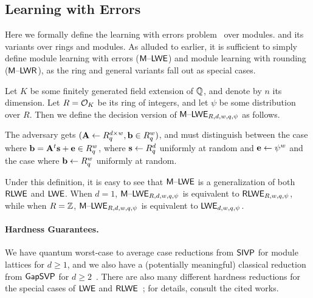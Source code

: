 \fi

\subsection{Learning with Errors}
\label{sec:learning-with-errors}

Here we formally define the learning with errors
problem~\cite{DBLP:journals/jacm/Regev09} 
\iflncs
over modules.
\else
and its variants over rings and modules. 
As alluded to earlier, it is sufficient to simply define
module learning with errors ($\mathsf{M \text{\textendash} LWE}$) and module learning with
rounding ($\mathsf{M \text{\textendash} LWR}$), as the ring and general variants fall out as
special cases. 

\begin{definition} Let $K$ be some finitely generated field extension of $\mathbb{Q}$, and denote
by $n$ its dimension. Let
$R=\mathcal{O}_{K}$ be its ring of integers, and let $\psi$ be some
distribution over $R$. Then we define the decision
version of $\mathsf{M \text{\textendash} LWE}_{R,d,w,q,\psi}$ as
follows.

The adversary gets
$(\mathbf{A} \gets R_q^{d \times w}, \mathbf{b} \in R_q^w)$, and must
distinguish between the case where $\mathbf{b} = \mathbf{A}^t\mathbf{s}+\mathbf{e} \in R_q^w$, where
$\mathbf{s} \gets R_q^d$ uniformly at random and $\mathbf{e} \gets
\psi^w$ and the case where $\mathbf{b} \gets R_q^w$ uniformly at
random.  

\end{definition}

Under this definition, it is easy to see that $\mathsf{M \text{\textendash} LWE}$ is a
generalization of both $\mathsf{RLWE}$ and $\mathsf{LWE}$. When $d=1$, $\mathsf{M \text{\textendash} LWE}_{R,d,w,q,\psi}$ is equivalent to
$\mathsf{RLWE}_{R,w,q,\psi}$, while when $R=\mathbb{Z}$, $\mathsf{M \text{\textendash} LWE}_{R,d,w,q,\psi}$ is
equivalent to $\mathsf{LWE}_{d,w,q,\psi}$. 

\iflncs
\else
\paragraph{Hardness Guarantees.} We have quantum worst-case to average case reductions from $\mathsf{SIVP}$ for
module lattices for $d \geq 1$, and we also have a (potentially
meaningful) classical reduction from $\mathsf{GapSVP}$ for $d\geq
2$~\cite{DBLP:journals/dcc/LangloisS15}. There are also many different
hardness reductions for the special cases of $\mathsf{LWE}$ and
$\mathsf{RLWE}$~\cite{DBLP:conf/stoc/Peikert09,DBLP:journals/jacm/Regev09,DBLP:journals/jacm/LyubashevskyPR13,DBLP:conf/stoc/BrakerskiLPRS13};
for details, consult the cited works.
\fi

